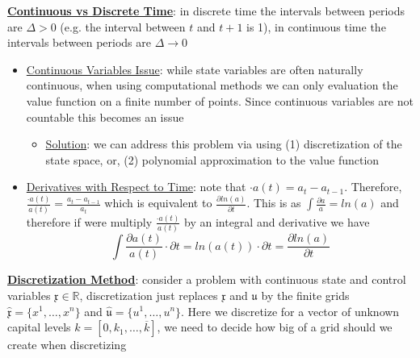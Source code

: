 \documentclass{article}
\begin{document}
\par \underline{\bf{Continuous vs Discrete Time}}: in discrete time the intervals between periods are $\Delta>0$ (e.g. the interval between $t$ and $t+1$ is 1), in continuous time the intervals between periods are $\Delta \rightarrow 0$
\begin{itemize}
    \item  \underline{Continuous Variables Issue}: while state variables are often naturally continuous, when using computational methods we can only evaluation the value function  on a finite number of points. Since continuous variables are not countable this becomes an issue
    \begin{itemize}
        \item \underline{Solution}: we can address this problem via using (1) discretization of the state space, or, (2) polynomial approximation to the value function
    \end{itemize}
    \item \underline{Derivatives with Respect to Time}: note that $\cdot{a}(t) = a_{t} - a_{t-1}$. Therefore, $\frac{\cdot{a}(t)}{a(t)} = \frac{a_{t} - a_{t-1}}{a_{t}}$ which is equivalent to $\frac{\partial ln(a)}{\partial t}$. This is as $\int \frac{\partial a}{a} = ln(a)$ and therefore if were multiply $\frac{\cdot{a}(t)}{a(t)}$ by an integral and derivative we have $$\int \frac{\partial a(t)}{a(t)} \cdot \partial t = ln(a(t)) \cdot \partial t = \frac{\partial ln(a)}{\partial t}$$
\end{itemize}
\vspace{2.5mm}
\par \underline{\bf{Discretization Method}}: consider a problem with continuous state and control variables $\mathfrak{x} \in \mathbb{R}$, discretization just replaces $\mathfrak{x}$ and $\mathfrak{u}$ by the finite grids $\widehat{\mathfrak{x}} = \{ x^{1}, \dots, x^{n} \}$ and $\widehat{\mathfrak{u}} = \{ u^{1}, \dots, u^{n} \}$. Here we discretize for a vector of unknown capital levels $k = [0, k_{1}, \dots, \overline{k}]$, we need to decide how big of a grid should we create when discretizing
\end{document}
